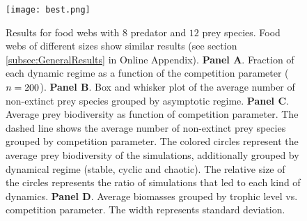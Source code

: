 \begin{figure}
	\begin{center}
		\texttt{[image: best.png]}
	\end{center}
	\caption{Results for food webs with $8$ predator and $12$ prey species. Food webs of different sizes show similar results (see section \ref{subsec:GeneralResults} in Online Appendix). \textbf{Panel A}. Fraction of each dynamic regime as a function of the competition parameter ($n = 200$). \textbf{Panel B}. Box and whisker plot of the average number of non-extinct prey species grouped by asymptotic regime. \textbf{Panel C}. Average prey biodiversity as function of competition parameter. The dashed line shows the average number of non-extinct prey species grouped by competition parameter. The colored circles represent the average prey biodiversity of the simulations, additionally grouped by dynamical regime (stable, cyclic and chaotic). The relative size of the circles represents the ratio of simulations that led to each kind of dynamics. \textbf{Panel D}. Average biomasses grouped by trophic level vs. competition parameter. The width represents standard deviation.}
	\label{fig:Biodiversity}
\end{figure}
